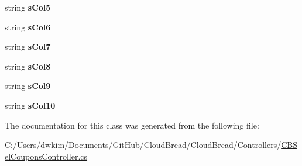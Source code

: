 \begin{DoxyCompactItemize}
\item 
string {\bfseries s\+Col5}\hypertarget{class_cloud_bread_1_1_controllers_1_1_c_b_sel_coupons_controller_1_1_model_a081671f2531e8f5accaa17806181a0f3}{}\label{class_cloud_bread_1_1_controllers_1_1_c_b_sel_coupons_controller_1_1_model_a081671f2531e8f5accaa17806181a0f3}

\item 
string {\bfseries s\+Col6}\hypertarget{class_cloud_bread_1_1_controllers_1_1_c_b_sel_coupons_controller_1_1_model_aedcc497f59499c059497c15428d25490}{}\label{class_cloud_bread_1_1_controllers_1_1_c_b_sel_coupons_controller_1_1_model_aedcc497f59499c059497c15428d25490}

\item 
string {\bfseries s\+Col7}\hypertarget{class_cloud_bread_1_1_controllers_1_1_c_b_sel_coupons_controller_1_1_model_a258d109e8a11fe0c5e4961588ceee4d1}{}\label{class_cloud_bread_1_1_controllers_1_1_c_b_sel_coupons_controller_1_1_model_a258d109e8a11fe0c5e4961588ceee4d1}

\item 
string {\bfseries s\+Col8}\hypertarget{class_cloud_bread_1_1_controllers_1_1_c_b_sel_coupons_controller_1_1_model_a1b5968beb2f762f5fa1d2019f16ce4a1}{}\label{class_cloud_bread_1_1_controllers_1_1_c_b_sel_coupons_controller_1_1_model_a1b5968beb2f762f5fa1d2019f16ce4a1}

\item 
string {\bfseries s\+Col9}\hypertarget{class_cloud_bread_1_1_controllers_1_1_c_b_sel_coupons_controller_1_1_model_a3e17d8eba70cb06629a4cf0b2ef994ec}{}\label{class_cloud_bread_1_1_controllers_1_1_c_b_sel_coupons_controller_1_1_model_a3e17d8eba70cb06629a4cf0b2ef994ec}

\item 
string {\bfseries s\+Col10}\hypertarget{class_cloud_bread_1_1_controllers_1_1_c_b_sel_coupons_controller_1_1_model_ae38f5fb2ca3c9837742caa805e530113}{}\label{class_cloud_bread_1_1_controllers_1_1_c_b_sel_coupons_controller_1_1_model_ae38f5fb2ca3c9837742caa805e530113}

\end{DoxyCompactItemize}


The documentation for this class was generated from the following file\+:\begin{DoxyCompactItemize}
\item 
C\+:/\+Users/dwkim/\+Documents/\+Git\+Hub/\+Cloud\+Bread/\+Cloud\+Bread/\+Controllers/\hyperlink{_c_b_sel_coupons_controller_8cs}{C\+B\+Sel\+Coupons\+Controller.\+cs}\end{DoxyCompactItemize}
